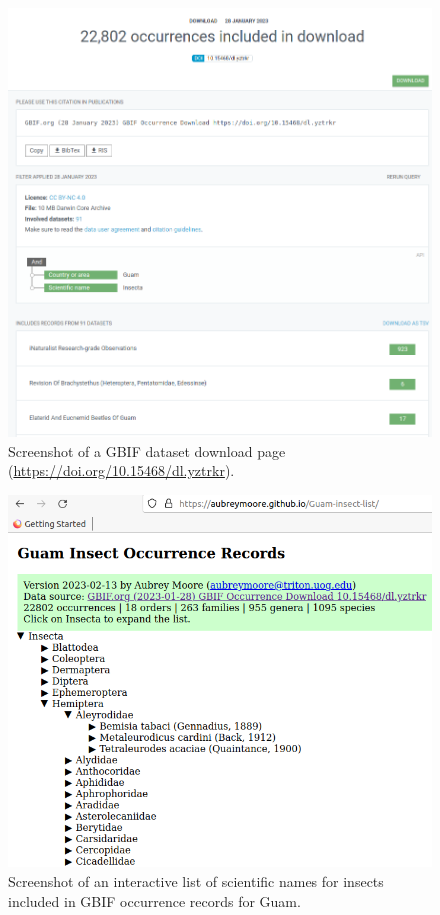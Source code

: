\documentclass[12pt,letterpaper,english,bibliography=totocnumbered, abstract=on]{scrartcl}
\begin{document}
\begin{figure}[h]
	\centering
	\includegraphics[width=\linewidth]{images/dataset-download}
	\caption{Screenshot of a GBIF dataset download page (\url{https://doi.org/10.15468/dl.yztrkr}).}
	\label{fig:dataset-download}
\end{figure}



\begin{figure}[h]
	\centering
	\includegraphics[width=\linewidth]{images/guam-insect-occurrence-records}
	\caption{Screenshot of an interactive list of scientific names for insects included in GBIF occurrence records for Guam.}
	\label{fig:guam-insect-occurrence-records}
\end{figure}

\clearpage



\end{document}
